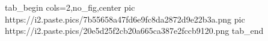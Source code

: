 
 
 
 
 


\ifcmt
  tab_begin cols=2,no_fig,center
     pic https://i2.paste.pics/7b55658a47fd6e9fc8da2872d9e22b3a.png
		 pic https://i2.paste.pics/20e5d25f2cb20a665ca387e2fccb9120.png
  tab_end
\fi
